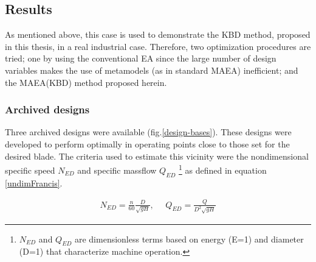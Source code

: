 
\subsection{Results}
As mentioned above, this case is used to demonstrate the KBD method, proposed in this thesis, in a real industrial case. Therefore, two optimization procedures are tried; one by using the conventional EA since the large number of design variables makes the use of metamodels (as in standard MAEA) inefficient; and the MAEA(KBD) method proposed herein.

\subsubsection{Archived designs}
Three archived designs were available (fig.\ref{design-bases}). These designs were developed to perform optimally in operating points close to those set for the desired blade. The criteria used to estimate this vicinity were the nondimensional specific speed $N_{ED}$ and specific massflow $Q_{ED}$ \footnote{$N_{ED}$ and $Q_{ED}$ are dimensionless terms based on energy (E=1) and diameter (D=1) that characterize machine operation.} as defined in equation \ref{undimFrancis}. 

\begin{eqnarray}
   N_{ED}=\frac{n}{60}\frac{D}{\sqrt{gH}}, ~~~~~~ Q_{ED}=\frac{Q}{D^2 \sqrt{gH}}
   \label{undimFrancis} 
\end{eqnarray}



